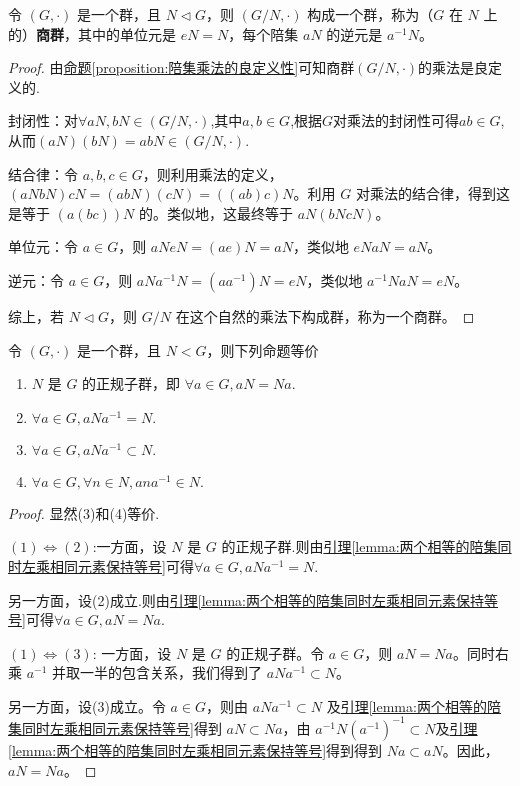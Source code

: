 \documentclass[../../main.tex]{subfiles}
\begin{document}
\begin{proposition}[商群]\label{proposition:商群}
令 $(G,\cdot)$ 是一个群，且 $N\lhd G$，则 $(G/N,\cdot)$ 构成一个群，称为（$G$ 在 $N$ 上的）\textbf{商群}，其中的单位元是 $eN = N$，每个陪集 $aN$ 的逆元是 $a^{-1}N$。
\end{proposition}
\begin{proof}
由\hyperref[proposition:陪集乘法的良定义性]{命题\ref{proposition:陪集乘法的良定义性}}可知商群$(G/N,\cdot)$的乘法是良定义的.

封闭性：对$\forall aN,bN\in (G/N,\cdot)$,其中$a,b\in G$,根据$G$对乘法的封闭性可得$ab\in G$,从而$(aN)(bN)=abN\in (G/N,\cdot)$.

结合律：令 $a,b,c\in G$，则利用乘法的定义，$(aNbN)cN=(abN)(cN)=((ab)c)N$。利用 $G$ 对乘法的结合律，得到这是等于 $(a(bc))N$ 的。类似地，这最终等于 $aN(bNcN)$。

单位元：令 $a\in G$，则 $aNeN=(ae)N = aN$，类似地 $eNaN = aN$。

逆元：令 $a\in G$，则 $aNa^{-1}N=(aa^{-1})N = eN$，类似地 $a^{-1}NaN = eN$。

综上，若 $N\lhd G$，则 $G/N$ 在这个自然的乘法下构成群，称为一个商群。 
\end{proof}

\begin{lemma}[正规子群的等价条件]\label{lemma:正规子群的等价条件}
令 $(G,\cdot)$ 是一个群，且 $N < G$，则下列命题等价
\begin{enumerate}[(1)]
\item $N$ 是 $G$ 的正规子群，即
$\forall a\in G, aN = Na .$

\item $\forall a\in G, aNa^{-1}= N .$

\item
$\forall a\in G, aNa^{-1}\subset N .$

\item 
$\forall a\in G, \forall n\in N, ana^{-1}\in N .$
\end{enumerate}
\end{lemma}
\begin{proof}
显然(3)和(4)等价.

$(1)\Leftrightarrow (2)$:一方面，设 $N$ 是 $G$ 的正规子群.则由\hyperref[lemma:两个相等的陪集同时左乘相同元素保持等号]{引理\ref{lemma:两个相等的陪集同时左乘相同元素保持等号}}可得$\forall a\in G, aNa^{-1}= N .$

另一方面，设(2)成立.则由\hyperref[lemma:两个相等的陪集同时左乘相同元素保持等号]{引理\ref{lemma:两个相等的陪集同时左乘相同元素保持等号}}可得$\forall a\in G, aN = Na .$

$(1)\Leftrightarrow (3)$:
一方面，设 $N$ 是 $G$ 的正规子群。令 $a\in G$，则 $aN = Na$。同时右乘 $a^{-1}$ 并取一半的包含关系，我们得到了 $aNa^{-1}\subset N$。

另一方面，设(3)成立。令 $a\in G$，则由 $aNa^{-1}\subset N$ 及\hyperref[lemma:两个相等的陪集同时左乘相同元素保持等号]{引理\ref{lemma:两个相等的陪集同时左乘相同元素保持等号}}得到 $aN\subset Na$，由 $a^{-1}N (a^{-1})^{-1}\subset N$及\hyperref[lemma:两个相等的陪集同时左乘相同元素保持等号]{引理\ref{lemma:两个相等的陪集同时左乘相同元素保持等号}}得到得到 $Na\subset aN$。因此，$aN = Na$。 
\end{proof}
\end{document}
